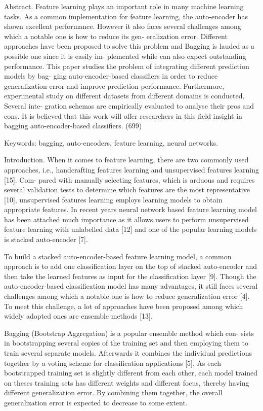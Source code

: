 Abstract. Feature learning plays an important role in many machine
learning tasks. As a common implementation for feature learning, the
auto-encoder has shown excellent performance. However it also faces
several challenges among which a notable one is how to reduce its gen-
eralization error. Different approaches have been proposed to solve this
problem and Bagging is lauded as a possible one since it is easily im-
plemented while can also expect outstanding performance. This paper
studies the problem of integrating different prediction models by bag-
ging auto-encoder-based classifiers in order to reduce generalization error
and improve prediction performance. Furthermore, experimental study
on different datasets from different domains is conducted. Several inte-
gration schemas are empirically evaluated to analyse their pros and cons.
It is believed that this work will offer researchers in this field insight in
bagging auto-encoder-based classifiers. (699)

Keywords: bagging, auto-encoders, feature learning, neural networks.

Introduction.
When it comes to feature learning, there are two commonly used approaches,
i.e., handcrafting features learning and unsupervised features learning [15]. Com-
pared with manually selecting features, which is arduous and requires several
validation tests to determine which features are the most representative [10],
unsupervised features learning employs learning models to obtain appropriate
features. In recent years neural network based feature learning model has been
attached much importance as it allows users to perform unsupervised feature
learning with unlabelled data [12] and one of the popular learning models is
stacked auto-encoder [7].

To build a stacked auto-encoder-based feature learning model, a common
approach is to add one classification layer on the top of stacked auto-encoder
and then take the learned features as input for the classification layer [9]. Though
the auto-encoder-based classification model has many advantages, it still faces
several challenges among which a notable one is how to reduce generalization
error [4]. To meet this challenge, a lot of approaches have been proposed among
which widely adopted ones are ensemble methods [13].

Bagging (Bootstrap Aggregation) is a popular ensemble method which con-
sists in bootstrapping several copies of the training set and then employing
them to train several separate models. Afterwards it combines the individual
predictions together by a voting scheme for classification applications [5]. As
each bootstrapped training set is slightly different from each other, each model
trained on theses training sets has different weights and different focus, thereby
having different generalization error. By combining them together, the overall
generalization error is expected to decrease to some extent.

